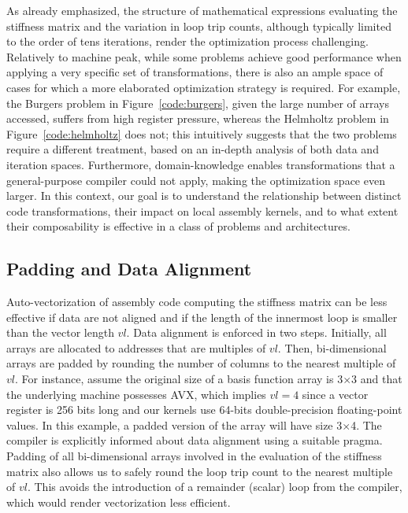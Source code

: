 \documentclass[conference]{IEEEtran}
\begin{document}
As already emphasized, the structure of mathematical expressions evaluating the stiffness matrix and the variation in loop trip counts, although typically limited to the order of tens iterations, render the optimization process challenging. Relatively to machine peak, while some problems achieve good performance when applying a very specific set of transformations, there is also an ample space of cases for which a more elaborated optimization strategy is required. For example, the Burgers problem in Figure~\ref{code:burgers}, given the large number of arrays accessed, suffers from high register pressure, whereas the Helmholtz problem in Figure~\ref{code:helmholtz} does not; this intuitively suggests that the two problems require a different treatment, based on an in-depth analysis of both data and iteration spaces. Furthermore, domain-knowledge enables transformations that a general-purpose compiler could not apply, making the optimization space even larger. In this context, our goal is to understand the relationship between distinct code transformations, their impact on local assembly kernels, and to what extent their composability is effective in a class of problems and architectures. 


\subsection{Padding and Data Alignment}
Auto-vectorization of assembly code computing the stiffness matrix can be less effective if data are not aligned and if the length of the innermost loop is smaller than the vector length $vl$. Data alignment is enforced in two steps. Initially, all arrays are allocated to addresses that are multiples of $vl$. Then, bi-dimensional arrays are padded by rounding the number of columns to the nearest multiple of $vl$. For instance, assume the original size of a basis function array is 3$\times$3 and that the underlying machine possesses AVX, which implies $vl=4$ since a vector register is 256 bits long and our kernels use 64-bits double-precision floating-point values. In this example, a padded version of the array will have size 3$\times$4. The compiler is explicitly informed about data alignment using a suitable pragma. Padding of all bi-dimensional arrays involved in the evaluation of the stiffness matrix also allows us to safely round the loop trip count to the nearest multiple of $vl$. This avoids the introduction of a remainder (scalar) loop from the compiler, which would render vectorization less efficient. 
\end{document}

